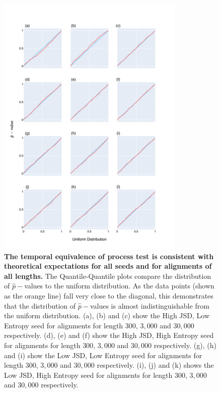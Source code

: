 \begin{figure}[!ht]
\centering
\includegraphics[width=0.8\textwidth]{figures/plots/synthetic/temp_eop/all_seeds.pdf}
\caption[The temporal equivalence of process test is consistent with theoretical expectations for all seeds and for alignments of all lengths]{\textbf{The temporal equivalence of process test is consistent with theoretical expectations for all seeds and for alignments of all lengths.} The Quantile-Quantile plots compare the distribution of $\hat p-$values to the uniform distribution. As the data points (shown as the orange line) fall very close to the diagonal, this demonstrates that the distribution of $\hat p-$values is almost indistinguishable from the uniform distribution. (a), (b) and (c) show the High JSD, Low Entropy seed for alignments for length $300$, $3,000$ and $30,000$ respectively. (d), (e) and (f) show the High JSD, High Entropy seed for alignments for length $300$, $3,000$ and $30,000$ respectively. (g), (h) and (i) show the Low JSD, Low Entropy seed for alignments for length $300$, $3,000$ and $30,000$ respectively. (i), (j) and (k) shows the Low JSD, High Entropy seed for alignments for length $300$, $3,000$ and $30,000$ respectively.}
\label{fig:synthetic/temp_eop/all_seeds}
\end{figure}